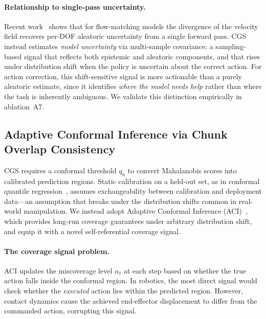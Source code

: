 \paragraph{Relationship to single-pass uncertainty.}
Recent work~\cite{xing2026diu} shows that for flow-matching models the divergence of the velocity field recovers per-DOF aleatoric uncertainty from a single forward pass.  CGS instead estimates \emph{model uncertainty} via multi-sample covariance: a sampling-based signal that reflects both epistemic and aleatoric components, and that rises under distribution shift when the policy is uncertain about the correct action.  For action correction, this shift-sensitive signal is more actionable than a purely aleatoric estimate, since it identifies \emph{where the model needs help} rather than where the task is inherently ambiguous.  We validate this distinction empirically in ablation~A7.


\subsection{Adaptive Conformal Inference via Chunk Overlap Consistency}
\label{sec:aci}

CGS requires a conformal threshold $q_h$ to convert Mahalanobis scores into calibrated prediction regions.  Static calibration on a held-out set, as in conformal quantile regression~\cite{romano2019cqr}, assumes exchangeability between calibration and deployment data---an assumption that breaks under the distribution shifts common in real-world manipulation.  We instead adopt Adaptive Conformal Inference (ACI)~\cite{gibbs2021aci}, which provides long-run coverage guarantees under arbitrary distribution shift, and equip it with a novel self-referential coverage signal.

\paragraph{The coverage signal problem.}
ACI updates the miscoverage level $\alpha_t$ at each step based on whether the true action falls inside the conformal region.  In robotics, the most direct signal would check whether the \emph{executed} action lies within the predicted region.  However, contact dynamics cause the achieved end-effector displacement to differ from the commanded action, corrupting this signal.

